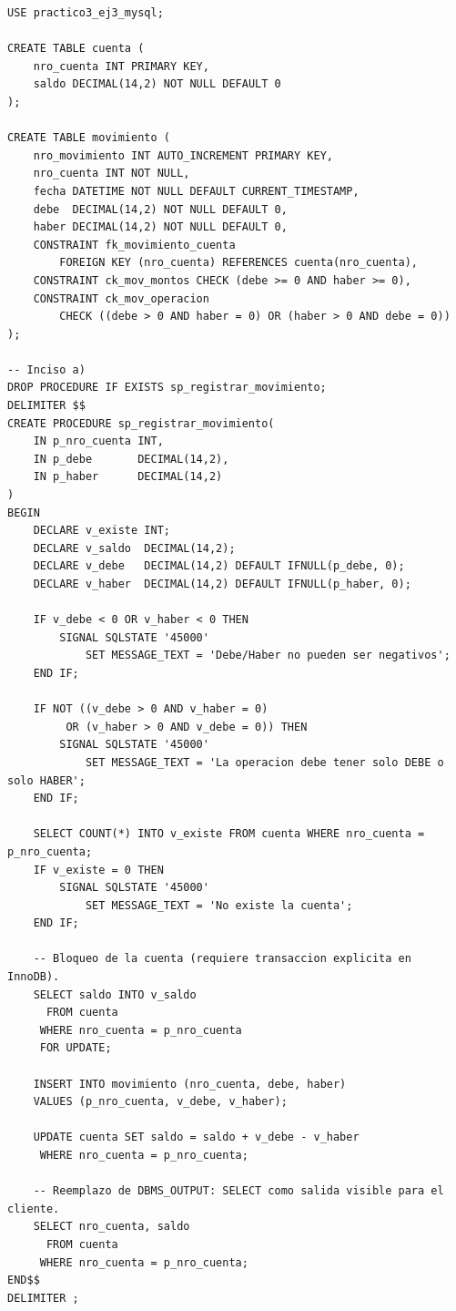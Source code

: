 \documentclass[11pt,a4paper]{article}
\begin{document}
\begin{lstlisting}
USE practico3_ej3_mysql;

CREATE TABLE cuenta (
    nro_cuenta INT PRIMARY KEY,
    saldo DECIMAL(14,2) NOT NULL DEFAULT 0
);

CREATE TABLE movimiento (
    nro_movimiento INT AUTO_INCREMENT PRIMARY KEY,
    nro_cuenta INT NOT NULL,
    fecha DATETIME NOT NULL DEFAULT CURRENT_TIMESTAMP,
    debe  DECIMAL(14,2) NOT NULL DEFAULT 0,
    haber DECIMAL(14,2) NOT NULL DEFAULT 0,
    CONSTRAINT fk_movimiento_cuenta
        FOREIGN KEY (nro_cuenta) REFERENCES cuenta(nro_cuenta),
    CONSTRAINT ck_mov_montos CHECK (debe >= 0 AND haber >= 0),
    CONSTRAINT ck_mov_operacion
        CHECK ((debe > 0 AND haber = 0) OR (haber > 0 AND debe = 0))
);

-- Inciso a)
DROP PROCEDURE IF EXISTS sp_registrar_movimiento;
DELIMITER $$
CREATE PROCEDURE sp_registrar_movimiento(
    IN p_nro_cuenta INT,
    IN p_debe       DECIMAL(14,2),
    IN p_haber      DECIMAL(14,2)
)
BEGIN
    DECLARE v_existe INT;
    DECLARE v_saldo  DECIMAL(14,2);
    DECLARE v_debe   DECIMAL(14,2) DEFAULT IFNULL(p_debe, 0);
    DECLARE v_haber  DECIMAL(14,2) DEFAULT IFNULL(p_haber, 0);

    IF v_debe < 0 OR v_haber < 0 THEN
        SIGNAL SQLSTATE '45000'
            SET MESSAGE_TEXT = 'Debe/Haber no pueden ser negativos';
    END IF;

    IF NOT ((v_debe > 0 AND v_haber = 0)
         OR (v_haber > 0 AND v_debe = 0)) THEN
        SIGNAL SQLSTATE '45000'
            SET MESSAGE_TEXT = 'La operacion debe tener solo DEBE o solo HABER';
    END IF;

    SELECT COUNT(*) INTO v_existe FROM cuenta WHERE nro_cuenta = p_nro_cuenta;
    IF v_existe = 0 THEN
        SIGNAL SQLSTATE '45000'
            SET MESSAGE_TEXT = 'No existe la cuenta';
    END IF;

    -- Bloqueo de la cuenta (requiere transaccion explicita en InnoDB).
    SELECT saldo INTO v_saldo
      FROM cuenta
     WHERE nro_cuenta = p_nro_cuenta
     FOR UPDATE;

    INSERT INTO movimiento (nro_cuenta, debe, haber)
    VALUES (p_nro_cuenta, v_debe, v_haber);

    UPDATE cuenta SET saldo = saldo + v_debe - v_haber
     WHERE nro_cuenta = p_nro_cuenta;

    -- Reemplazo de DBMS_OUTPUT: SELECT como salida visible para el cliente.
    SELECT nro_cuenta, saldo
      FROM cuenta
     WHERE nro_cuenta = p_nro_cuenta;
END$$
DELIMITER ;


\end{lstlisting}
\end{document}
